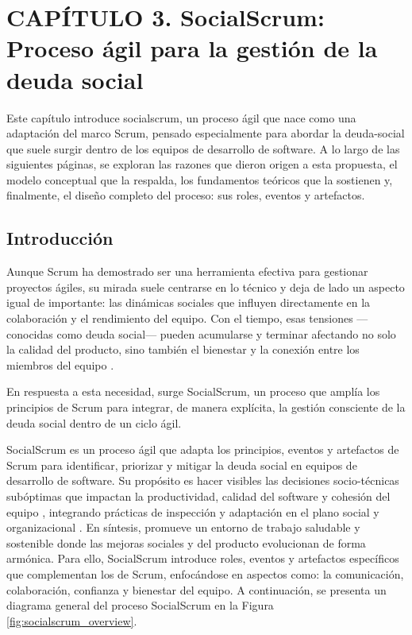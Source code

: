 ﻿\chapter*{CAPÍTULO 3. SocialScrum: Proceso ágil para la gestión de la deuda social}
\setcounter{chapter}{3}
\setcounter{section}{0}
\setcounter{subsection}{0}
\setcounter{subsubsection}{0}
\renewcommand{\thesection}{\thechapter.\arabic{section}}
\renewcommand{\thesubsection}{\thesection.\arabic{subsection}}
\renewcommand{\thesubsubsection}{\thesubsection.\arabic{subsubsection}}

Este capítulo introduce \gls{socialscrum}, un proceso ágil que nace como una adaptación del marco Scrum, pensado especialmente para abordar la \gls{deuda-social} que suele surgir dentro de los equipos de desarrollo de software.
A lo largo de las siguientes páginas, se exploran las razones que dieron origen a esta propuesta, el modelo conceptual que la respalda, los fundamentos teóricos que la sostienen y, finalmente, el diseño completo del proceso: sus roles, eventos y artefactos.

\section{Introducción}

Aunque Scrum ha demostrado ser una herramienta efectiva para gestionar proyectos ágiles, su mirada suele centrarse en lo técnico y deja de lado un aspecto igual de importante: las dinámicas sociales que influyen directamente en la colaboración y el rendimiento del equipo. Con el tiempo, esas tensiones —conocidas como deuda social— pueden acumularse y terminar afectando no solo la calidad del producto, sino también el bienestar y la conexión entre los miembros del equipo \cite{tamburri2013socialdebt}.

En respuesta a esta necesidad, surge SocialScrum, un proceso que amplía los principios de Scrum para integrar, de manera explícita, la gestión consciente de la deuda social dentro de un ciclo ágil.

SocialScrum es un proceso ágil que adapta los principios, eventos y artefactos de Scrum para identificar, priorizar y mitigar la deuda social en equipos de desarrollo de software. Su propósito es hacer visibles las decisiones socio-técnicas subóptimas que impactan la productividad, calidad del software y cohesión del equipo \cite{tamburri2013socialdebt}, integrando prácticas de inspección y adaptación en el plano social y organizacional \cite{saeeda2024nontechnicaldebt}. En síntesis, promueve un entorno de trabajo saludable y sostenible donde las mejoras sociales y del producto evolucionan de forma armónica. Para ello, SocialScrum introduce roles, eventos y artefactos específicos que complementan los de Scrum, enfocándose en aspectos como: la comunicación, colaboración, confianza y bienestar del equipo. A continuación, se presenta un diagrama general del proceso SocialScrum en la Figura \ref{fig:socialscrum_overview}.

